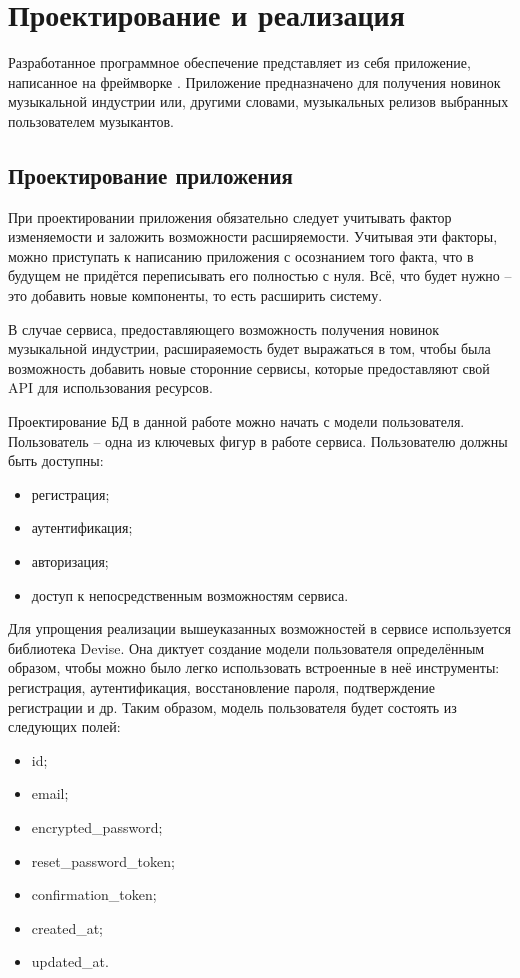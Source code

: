 \section{Проектирование и реализация} %
\label{sec:arch_and_realization}


Разработанное программное обеспечение представляет из себя приложение, написанное на фреймворке \ror.
Приложение предназначено для получения новинок музыкальной индустрии или, другими словами, музыкальных релизов выбранных пользователем музыкантов.

\subsection{Проектирование приложения}
\label{sub:arch_and_mod:design}
При проектировании приложения обязательно следует учитывать фактор изменяемости и заложить возможности расширяемости. Учитывая эти факторы, можно приступать к написанию приложения с осознанием того факта, что в будущем не придётся переписывать его полностью с нуля. Всё, что будет нужно -- это добавить новые компоненты, то есть расширить систему.

В случае сервиса, предоставляющего возможность получения новинок музыкальной индустрии, расшираяемость будет выражаться в том, чтобы была возможность добавить новые сторонние сервисы, которые предоставляют свой API для использования ресурсов.

Проектирование БД в данной работе можно начать с модели пользователя. Пользователь -- одна из ключевых фигур в работе сервиса. Пользователю должны быть доступны:

\begin{itemize}
  \item регистрация;
  \item аутентификация;
  \item авторизация;
  \item доступ к непосредственным возможностям сервиса.
\end{itemize}

Для упрощения реализации вышеуказанных возможностей в сервисе используется библиотека Devise. Она диктует создание модели пользователя определённым образом, чтобы можно было легко использовать встроенные в неё инструменты: регистрация, аутентификация, восстановление пароля, подтверждение регистрации и др. Таким образом, модель пользователя будет состоять из следующих полей:

\begin{itemize}
  \item id;
  \item email;
  \item encrypted\_password;
  \item reset\_password\_token;
  \item confirmation\_token;
  \item created\_at;
  \item updated\_at.
\end{itemize}

